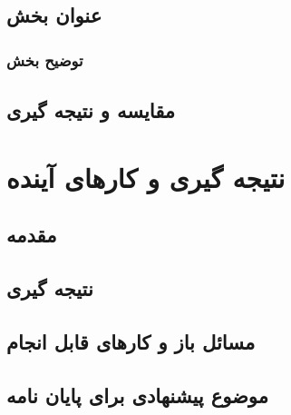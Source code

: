\documentclass[12pt,a4paper]{article}
\theoremstyle{definition}
\theoremstyle{theorem}
\theoremstyle{definition}
\begin{document}
	\subsection{عنوان بخش}
	\subsubsection{توضیح بخش}
	\subsection{مقایسه و نتیجه گیری}
	\section{نتیجه گیری و کار‌های آینده}
	\subsection{مقدمه}
	\subsection{نتیجه گیری}
	\subsection{مسائل باز و کارهای قابل انجام}
	\subsection{موضوع پیشنهادی برای پایان نامه}
	\newpage
	
\end{document}
